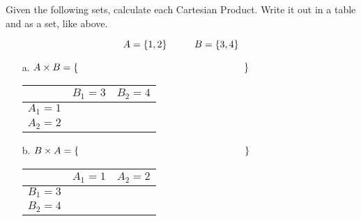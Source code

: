 \documentclass[a4paper,12pt]{book}
\newcounter{question}
\begin{document}
        \begin{questionNOGRADE}{\thequestion}

            Given the following sets, calculate each Cartesian Product.
            Write it out in a table and as a set, like above.

            $$ A = \{1, 2\} \hspace*{1cm} B = \{3, 4\} $$

            \begin{enumerate}
                \item[a.] $A \times B = \{ \tab[6cm] \}$
                    \begin{center}
                        \begin{tabular}{c | c | c}
                            & $B_{1} = 3$ & $B_{2} = 4$ \\ \hline
                            $A_{1} = 1$ & & \\
                            $A_{2} = 2$ & &
                        \end{tabular}
                    \end{center}

                
                \item[b.] $B \times A = \{ \tab[6cm] \}$
                    \begin{center}
                        \begin{tabular}{c | c | c}
                            & $A_{1} = 1$ & $A_{2} = 2$ \\ \hline
                            $B_{1} = 3$ & & \\
                            $B_{2} = 4$ & &
                        \end{tabular}
                    \end{center}

            \end{enumerate}

        \end{questionNOGRADE}

        \newpage
\end{document}
